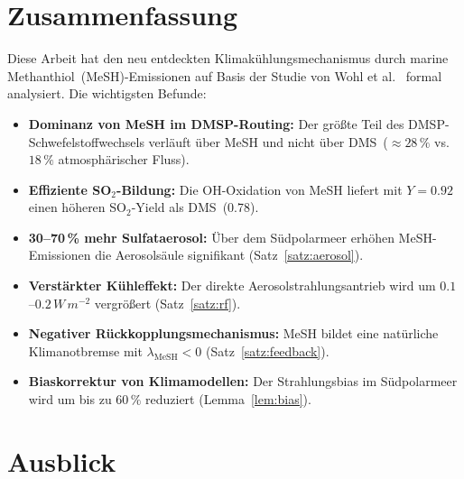 ﻿\documentclass[a4paper,12pt]{article}
\theoremstyle{definition}
\begin{document}
\section{Zusammenfassung}

Diese Arbeit hat den neu entdeckten Klimakühlungsmechanismus durch marine Methanthiol~(MeSH)-Emissionen
auf Basis der Studie von Wohl et al.~\cite{wohl2024} formal analysiert. Die wichtigsten Befunde:

\begin{itemize}
  \item \textbf{Dominanz von MeSH im DMSP-Routing:} Der größte Teil des DMSP-Schwefelstoffwechsels
        verläuft über MeSH und nicht über DMS~($\approx 28\,\%$ vs.\ $18\,\%$ atmosphärischer Fluss).
  \item \textbf{Effiziente SO$_2$-Bildung:} Die OH-Oxidation von MeSH liefert mit $Y = 0.92$
        einen höheren SO$_2$-Yield als DMS~(0.78).
  \item \textbf{30--70\,\% mehr Sulfataerosol:} Über dem Südpolarmeer erhöhen MeSH-Emissionen die
        Aerosolsäule signifikant (Satz~\ref{satz:aerosol}).
  \item \textbf{Verstärkter Kühleffekt:} Der direkte Aerosolstrahlungsantrieb wird um
        $0.1$--$0.2\,\si{W\,m^{-2}}$ vergrößert (Satz~\ref{satz:rf}).
  \item \textbf{Negativer Rückkopplungsmechanismus:} MeSH bildet eine natürliche Klimanotbremse
        mit $\lambda_{\mathrm{MeSH}} < 0$ (Satz~\ref{satz:feedback}).
  \item \textbf{Biaskorrektur von Klimamodellen:} Der Strahlungsbias im Südpolarmeer wird um
        bis zu $60\,\%$ reduziert (Lemma~\ref{lem:bias}).
\end{itemize}

\section{Ausblick}
\end{document}
